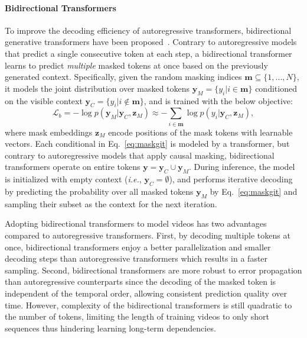 \documentclass[10pt,twocolumn,letterpaper]{article}
\begin{document}
\paragraph{Bidirectional Transformers}
\label{sec:maskgit}
\ifdefined{} \fi
To improve the decoding efficiency of autoregressive transformers,
bidirectional generative transformers have been proposed~\cite{MaskGIT, M6-UFC, MMVID}.
Contrary to autoregressive models that predict a single consecutive token at each step, a bidirectional transformer learns to predict \emph{multiple} masked tokens at once based on the previously generated context.
Specifically, given the random masking indices $\mathbf{m}\subseteq\{1,...,N\}$, it models the joint distribution over masked tokens $\mathbf{y}_M= \{y_i | i \in \mathbf{m}\}$ conditioned on the visible context $\mathbf{y}_C = \{y_i | i \notin \mathbf{m}\}$, and is trained with the below objective:
\begin{equation}
\label{eq:maskgit}
    \mathcal{L}_b=-\log{p(\mathbf{y}_M|\mathbf{y}_C, \mathbf{z}_M)}
\approx -\sum_{i \in \mathbf{m}} \log{p(y_i|\mathbf{y}_C, \mathbf{z}_M)},
\end{equation}
where mask embeddings $\mathbf{z}_M$ encode positions of the mask tokens with learnable vectors. 
Each conditional in Eq.~\eqref{eq:maskgit} is modeled by a transformer, but contrary to autoregressive models that apply causal masking, bidirectional transformers operate on entire tokens $\mathbf{y}=\mathbf{y}_C\cup \mathbf{y}_M$.
During inference, the model is initialized with empty context (\emph{i.e.}, $\mathbf{y}_C=\emptyset$), and performs iterative decoding by predicting the probability over all masked tokens $\mathbf{y}_M$ by Eq.~\eqref{eq:maskgit} and sampling their subset as the context for the next iteration.




Adopting bidirectional transformers to model videos has two advantages compared to autoregressive transformers.
First, by decoding multiple tokens at once, bidirectional transformers enjoy a better parallelization and smaller decoding steps than autoregressive transformers which results in a faster sampling.
Second, bidirectional transformers are more robust to error propagation than autoregressive counterparts since the decoding of the masked token is independent of the temporal order, allowing consistent prediction quality over time.
However, complexity of the bidirectional transformers is still quadratic to the number of tokens, limiting the length of training videos to only short sequences thus hindering learning long-term dependencies.
\end{document}
